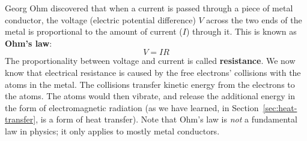 Georg Ohm discovered that when a current is passed through a piece of metal
conductor, the voltage (electric potential difference) $V$ across the two ends
of the metal is proportional to the amount of current ($I$) through it. This is
known as \textbf{Ohm's law}:
\begin{equation}
  \boxed{
    V=IR
  }
\end{equation}
The proportionality between voltage and current is called \textbf{resistance}.
We now know that electrical resistance is caused by the free electrons'
collisions with the atoms in the metal. The collisions transfer kinetic energy
from the electrons to the atoms. The atoms would then vibrate, and release
the additional energy in the form of electromagnetic radiation (as we have
learned, in Section~\ref{sec:heat-transfer}, is a form of heat transfer).
Note that Ohm's law is \emph{not} a fundamental law in physics; it only applies
to mostly metal conductors.

